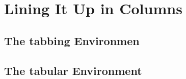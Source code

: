 \section{Lining It Up in Columns}
\subsection{The tabbing Environmen}


\subsection{The tabular Environment}
\newpage